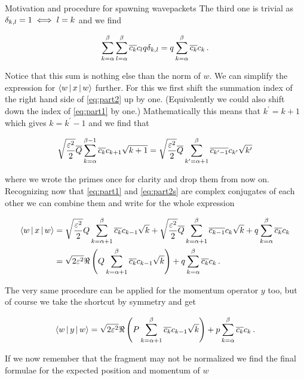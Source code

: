 \begin{chapter}{Motivation and procedure for spawning wavepackets}
The third one is trivial as $\delta_{k,l} = 1 \iff l=k$ and we find

\begin{equation}
  \sum_{k=\alpha}^\beta \sum_{l=\alpha}^\beta \overline{c_k} c_l q \delta_{k,l} = q \sum_{k=\alpha}^\beta \overline{c_k} c_k \,.
\end{equation}

Notice that this sum is nothing else than the norm of $w$.
We can simplify the expression for $\Braket{w|x|w}$ further. For this we first shift
the summation index of the right hand side of \eqref{eq:part2} up by one. (Equivalently
we could also shift down the index of \eqref{eq:part1} by one.) Mathematically this means
that $k^\prime = k+1$ which gives $k = k^\prime -1$ and we find that

\begin{equation} \label{eq:part2s}
  \sqrt{\frac{\varepsilon^2}{2}} \overline{Q} \sum_{k=\alpha}^{\beta-1} \overline{c_k} c_{k+1} \sqrt{k+1}
  = \sqrt{\frac{\varepsilon^2}{2}} \overline{Q} \sum_{k^\prime=\alpha+1}^{\beta} \overline{c_{k^\prime-1}} c_{k^\prime} \sqrt{k^\prime}
\end{equation}

where we wrote the primes once for clarity and drop them from now on. Recognizing
now that \eqref{eq:part1} and \eqref{eq:part2s} are complex conjugates of each other
we can combine them and write for the whole expression

\begin{align}
  \Braket{w|x|w}
  & = \sqrt{\frac{\varepsilon^2}{2}} Q \sum_{k=\alpha+1}^\beta \overline{c_k} c_{k-1} \sqrt{k}
    + \sqrt{\frac{\varepsilon^2}{2}} \overline{Q} \sum_{k=\alpha+1}^{\beta} \overline{c_{k-1}} c_{k} \sqrt{k}
    + q \sum_{k=\alpha}^\beta \overline{c_k} c_k \nonumber \\
  & = \sqrt{2 \varepsilon^2} \Re \left(Q \sum_{k=\alpha+1}^\beta \overline{c_k} c_{k-1} \sqrt{k} \right)
    + q \sum_{k=\alpha}^\beta \overline{c_k} c_k \,.
\end{align}

The very same procedure can be applied for the momentum operator $y$ too, but of
course we take the shortcut by symmetry and get

\begin{equation}
  \Braket{w|y|w}
  = \sqrt{2 \varepsilon^2} \Re \left(P \sum_{k=\alpha+1}^\beta \overline{c_k} c_{k-1} \sqrt{k} \right)
  + p \sum_{k=\alpha}^\beta \overline{c_k} c_k \,.
\end{equation}

If we now remember that the fragment may not be normalized we find the final formulae
for the expected position and momentum of $w$


\end{chapter}
